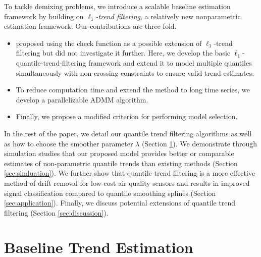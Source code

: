 \documentclass[12pt]{article}
\begin{document}
To tackle demixing problems, we introduce a scalable baseline estimation framework by building on \textit{$\ell_1$-trend filtering}, a relatively new nonparametric estimation framework. Our contributions are three-fold. 
\begin{itemize}
\item \cite{Kim2009} proposed using the check function as a possible extension of $\ell_1$-trend filtering but did not investigate it further. Here, we develop the basic $\ell_1$-quantile-trend-filtering framework and extend it to model multiple quantiles simultaneously with non-crossing constraints to ensure valid trend estimates. 
\item To reduce computation time and extend the method to long time series, we develop a parallelizable ADMM algorithm. 
\item Finally, we propose a modified criterion for performing model selection.
\end{itemize}

	In the rest of the paper, we detail our quantile trend filtering algorithms as well as how to choose the smoother parameter $\lambda$ (Section \ref{sec:methods}). We demonstrate through simulation studies that our proposed model provides better or comparable estimates of non-parametric quantile trends than existing methods (Section \ref{sec:simluation}). We further show that quantile trend filtering is a more effective method of drift removal for low-cost air quality sensors and results in improved signal classification compared to quantile smoothing splines (Section \ref{sec:application}). Finally, we discuss potential extensions of quantile trend filtering (Section \ref{sec:discussion}). 

\section{Baseline Trend Estimation}
\label{sec:methods}


\end{document}
